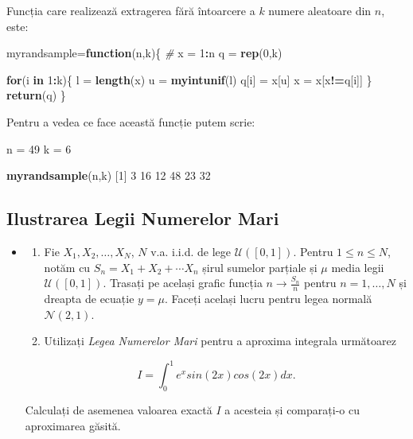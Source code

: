 \documentclass[]{article}
\newenvironment{Shaded}{\begin{snugshade}}{\end{snugshade}}
\newcommand{\CommentTok}[1]{\textcolor[rgb]{0.56,0.35,0.01}{\textit{#1}}}
\newcommand{\ControlFlowTok}[1]{\textcolor[rgb]{0.13,0.29,0.53}{\textbf{#1}}}
\newcommand{\DecValTok}[1]{\textcolor[rgb]{0.00,0.00,0.81}{#1}}
\newcommand{\KeywordTok}[1]{\textcolor[rgb]{0.13,0.29,0.53}{\textbf{#1}}}
\newcommand{\NormalTok}[1]{#1}
\newcommand{\OperatorTok}[1]{\textcolor[rgb]{0.81,0.36,0.00}{\textbf{#1}}}
\newcommand{\StringTok}[1]{\textcolor[rgb]{0.31,0.60,0.02}{#1}}
\newenvironment{frshaded*}{%
  \def\FrameCommand{\fboxrule=\FrameRule\fboxsep=\FrameSep \fcolorbox{framecolor}{shadecolor1}}%
  \MakeFramed {\advance\hsize-\width \FrameRestore}}%
{\endMakeFramed}
\newenvironment{rmdblock}[1]
  {\begin{frshaded*}
  \begin{itemize}
  \renewcommand{\labelitemi}{
    \raisebox{-.7\height}[0pt][0pt]{
      {\setkeys{Gin}{width=2em,keepaspectratio}\texttt{[image: images/icons/\#1]}}
    }
  }
  \item
  }
  {
  \end{itemize}
  \end{frshaded*}
  }
\newenvironment{rmdexercise}
  {\begin{rmdblock}{exercise}}
  {\end{rmdblock}}
\begin{document}
Funcția care realizează extragerea fără întoarcere a \(k\) numere
aleatoare din \(n\), este:

\begin{Shaded}
\begin{Highlighting}[]
\NormalTok{myrandsample=}\ControlFlowTok{function}\NormalTok{(n,k)\{}
  \CommentTok{# }
\NormalTok{  x =}\StringTok{ }\DecValTok{1}\OperatorTok{:}\NormalTok{n}
\NormalTok{  q =}\StringTok{ }\KeywordTok{rep}\NormalTok{(}\DecValTok{0}\NormalTok{,k)}
  
  \ControlFlowTok{for}\NormalTok{(i }\ControlFlowTok{in} \DecValTok{1}\OperatorTok{:}\NormalTok{k)\{}
\NormalTok{    l =}\StringTok{ }\KeywordTok{length}\NormalTok{(x)}
\NormalTok{    u =}\StringTok{ }\KeywordTok{myintunif}\NormalTok{(l)}
\NormalTok{    q[i] =}\StringTok{ }\NormalTok{x[u]}
\NormalTok{    x =}\StringTok{ }\NormalTok{x[x}\OperatorTok{!=}\NormalTok{q[i]]}
\NormalTok{  \}}
  \KeywordTok{return}\NormalTok{(q)}
\NormalTok{\}}
\end{Highlighting}
\end{Shaded}

Pentru a vedea ce face această funcție putem scrie:

\begin{Shaded}
\begin{Highlighting}[]
\NormalTok{n =}\StringTok{ }\DecValTok{49}
\NormalTok{k =}\StringTok{ }\DecValTok{6}

\KeywordTok{myrandsample}\NormalTok{(n,k)}
\NormalTok{[}\DecValTok{1}\NormalTok{]  }\DecValTok{3} \DecValTok{16} \DecValTok{12} \DecValTok{48} \DecValTok{23} \DecValTok{32}
\end{Highlighting}
\end{Shaded}

\hypertarget{ilustrarea-legii-numerelor-mari}{%
\subsection{Ilustrarea Legii Numerelor
Mari}\label{ilustrarea-legii-numerelor-mari}}

\begin{rmdexercise}
\begin{enumerate}
\def\labelenumi{\alph{enumi})}
\item
  Fie \(X_1,X_2,\dots,X_N\), \(N\) v.a. i.i.d. de lege
  \(\mathcal{U}([0,1])\). Pentru \(1\leq n\leq N\), notăm cu
  \(S_n=X_1+X_2+\cdots X_n\) șirul sumelor parțiale și \(\mu\) media
  legii \(\mathcal{U}([0,1])\). Trasați pe același grafic funcția
  \(n\to \frac{S_n}{n}\) pentru \(n=1,\dots,N\) și dreapta de ecuație
  \(y=\mu\). Faceți același lucru pentru legea normală
  \(\mathcal{N}(2,1)\).
\item
  Utilizați \emph{Legea Numerelor Mari} pentru a aproxima integrala
  următoarez
\end{enumerate}

\[I = \int_{0}^{1}e^{x}sin(2x)cos(2x)dx.\]

Calculați de asemenea valoarea exactă \(I\) a acesteia și comparați-o cu
aproximarea găsită.
\end{rmdexercise}
\end{document}
